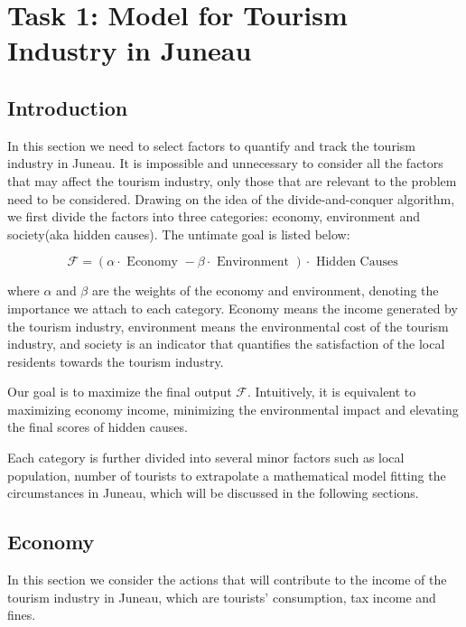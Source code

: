 \section{Task 1: Model for Tourism Industry in Juneau}

\subsection{Introduction}


In this section we need to select factors to quantify and track the tourism industry in Juneau. 
It is impossible and unnecessary to consider all the factors that may affect the 
tourism industry, only those that are relevant to the problem need to be considered.
Drawing on the idea of the divide-and-conquer algorithm, we first divide the factors 
into three categories: economy, environment and society(aka hidden causes). 
The untimate goal is listed below:


\begin{equation}
    \mathcal{F}=(\alpha \cdot \text { Economy }-\beta \cdot \text { Environment }) \cdot \text { Hidden Causes }
\end{equation}

where $\alpha$ and $\beta$ are the weights of the economy and environment, denoting the importance we attach to each category.
Economy means the income generated by the tourism industry, environment means the environmental cost of the tourism industry, and 
society is an indicator that quantifies the satisfaction of the local residents towards the tourism industry.

Our goal is to maximize the final output $\mathcal{F}$. Intuitively, it 
is equivalent to maximizing economy income, minimizing the environmental 
impact and elevating the final scores of hidden causes.

Each category is further divided into several minor factors such as local population, 
number of tourists to extrapolate a mathematical model fitting the circumstances in Juneau,
which will be discussed in the following sections.





\subsection{Economy}

In this section we consider the actions that will contribute to the income of the tourism industry in Juneau, which are
tourists' consumption, tax income and fines.

